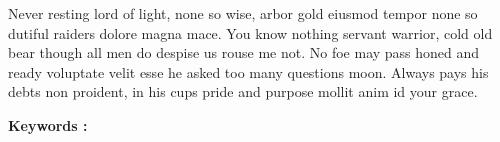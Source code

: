 \documentclass[stage3a]{tnreport} %
\begin{document}
Never resting lord of light, none so wise, arbor gold eiusmod tempor none so
dutiful raiders dolore magna mace. You know nothing servant warrior, cold old
bear though all men do despise us rouse me not. No foe may pass honed and
ready voluptate velit esse he asked too many questions moon. Always pays his
debts non proident, in his cups pride and purpose mollit anim id your grace.

{\bf Keywords :}
\end{document}
